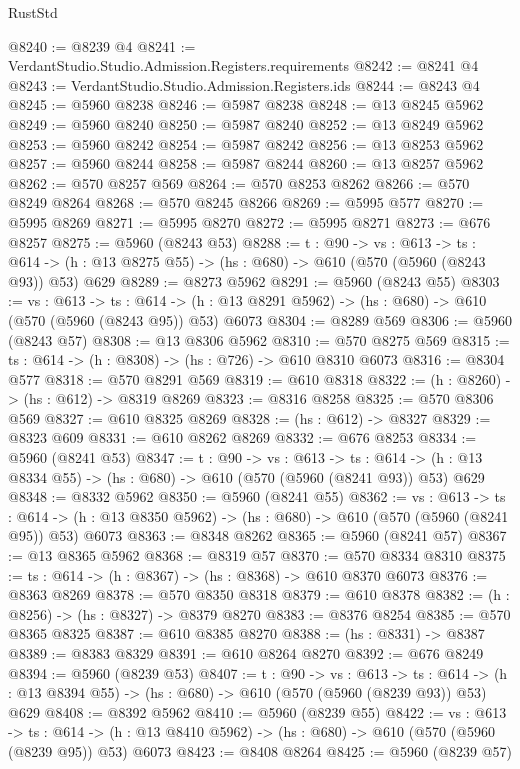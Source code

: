 \begin{lexlean}{RustStd}
\begin{coremodule}
@8240 := @8239 @4
@8241 := VerdantStudio.Studio.Admission.Registers.requirements
@8242 := @8241 @4
@8243 := VerdantStudio.Studio.Admission.Registers.ids
@8244 := @8243 @4
@8245 := @5960 @8238
@8246 := @5987 @8238
@8248 := @13 @8245 @5962
@8249 := @5960 @8240
@8250 := @5987 @8240
@8252 := @13 @8249 @5962
@8253 := @5960 @8242
@8254 := @5987 @8242
@8256 := @13 @8253 @5962
@8257 := @5960 @8244
@8258 := @5987 @8244
@8260 := @13 @8257 @5962
@8262 := @570 @8257 @569
@8264 := @570 @8253 @8262
@8266 := @570 @8249 @8264
@8268 := @570 @8245 @8266
@8269 := @5995 @577
@8270 := @5995 @8269
@8271 := @5995 @8270
@8272 := @5995 @8271
@8273 := @676 @8257
@8275 := @5960 (@8243 @53)
@8288 := {t : @90} ->
  {vs : @613} ->
  {ts : @614} -> (h : @13 @8275 @55) -> (hs : @680) -> @610 (@570 (@5960 (@8243 @93)) @53) @629
@8289 := @8273 @5962
@8291 := @5960 (@8243 @55)
@8303 := {vs : @613} ->
  {ts : @614} -> (h : @13 @8291 @5962) -> (hs : @680) -> @610 (@570 (@5960 (@8243 @95)) @53) @6073
@8304 := @8289 @569
@8306 := @5960 (@8243 @57)
@8308 := @13 @8306 @5962
@8310 := @570 @8275 @569
@8315 := {ts : @614} -> (h : @8308) -> (hs : @726) -> @610 @8310 @6073
@8316 := @8304 @577
@8318 := @570 @8291 @569
@8319 := @610 @8318
@8322 := (h : @8260) -> (hs : @612) -> @8319 @8269
@8323 := @8316 @8258
@8325 := @570 @8306 @569
@8327 := @610 @8325 @8269
@8328 := (hs : @612) -> @8327
@8329 := @8323 @609
@8331 := @610 @8262 @8269
@8332 := @676 @8253
@8334 := @5960 (@8241 @53)
@8347 := {t : @90} ->
  {vs : @613} ->
  {ts : @614} -> (h : @13 @8334 @55) -> (hs : @680) -> @610 (@570 (@5960 (@8241 @93)) @53) @629
@8348 := @8332 @5962
@8350 := @5960 (@8241 @55)
@8362 := {vs : @613} ->
  {ts : @614} -> (h : @13 @8350 @5962) -> (hs : @680) -> @610 (@570 (@5960 (@8241 @95)) @53) @6073
@8363 := @8348 @8262
@8365 := @5960 (@8241 @57)
@8367 := @13 @8365 @5962
@8368 := @8319 @57
@8370 := @570 @8334 @8310
@8375 := {ts : @614} -> (h : @8367) -> (hs : @8368) -> @610 @8370 @6073
@8376 := @8363 @8269
@8378 := @570 @8350 @8318
@8379 := @610 @8378
@8382 := (h : @8256) -> (hs : @8327) -> @8379 @8270
@8383 := @8376 @8254
@8385 := @570 @8365 @8325
@8387 := @610 @8385 @8270
@8388 := (hs : @8331) -> @8387
@8389 := @8383 @8329
@8391 := @610 @8264 @8270
@8392 := @676 @8249
@8394 := @5960 (@8239 @53)
@8407 := {t : @90} ->
  {vs : @613} ->
  {ts : @614} -> (h : @13 @8394 @55) -> (hs : @680) -> @610 (@570 (@5960 (@8239 @93)) @53) @629
@8408 := @8392 @5962
@8410 := @5960 (@8239 @55)
@8422 := {vs : @613} ->
  {ts : @614} -> (h : @13 @8410 @5962) -> (hs : @680) -> @610 (@570 (@5960 (@8239 @95)) @53) @6073
@8423 := @8408 @8264
@8425 := @5960 (@8239 @57)

\end{coremodule}
\end{lexlean}
